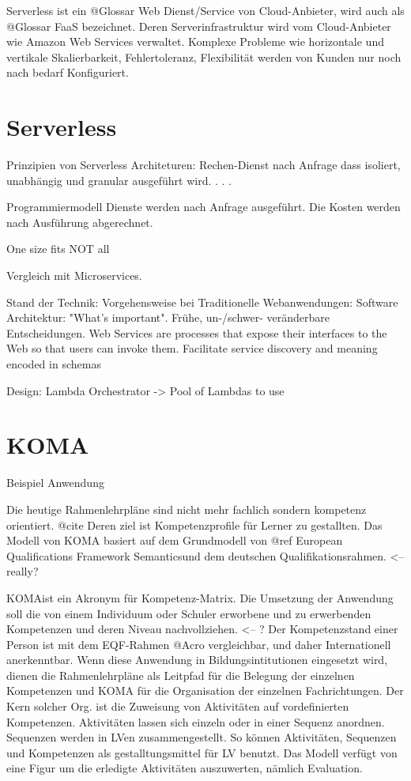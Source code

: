 \documentclass[
12pt,
english,
ngerman,
headsepline,
twoside,
openright,
numbers=noenddot,version=first
]{scrreprt}
\begin{document}
Serverless ist ein @Glossar Web Dienst/Service von Cloud-Anbieter, wird auch als @Glossar FaaS bezeichnet. Deren Serverinfrastruktur wird vom Cloud-Anbieter wie Amazon Web Services verwaltet. Komplexe Probleme wie horizontale und vertikale Skalierbarkeit, Fehlertoleranz, Flexibilität werden von Kunden nur noch nach bedarf Konfiguriert. 


\section{Serverless}
\label{sec:serverless}
Prinzipien von Serverless Architeturen: \cite{sbarski2017serverless}
Rechen-Dienst nach Anfrage dass isoliert, unabhängig und granular ausgeführt wird. 
. . .



Programmiermodell 
Dienste werden nach Anfrage ausgeführt. 
Die Kosten werden nach Ausführung abgerechnet. 

One size fits NOT all

Vergleich mit Microservices.


Stand der Technik: 
Vorgehensweise bei Traditionelle Webanwendungen:  
Software Architektur: "What's important". Frühe, un-/schwer- veränderbare Entscheidungen.
Web Services are processes that expose their interfaces to the Web so that users can invoke them. Facilitate service discovery and meaning encoded in schemas


Design: Lambda Orchestrator -> Pool of Lambdas to use

\section{KOMA}{Beispiel Anwendung}
\label{sec:KOMA}

Die heutige Rahmenlehrpläne sind nicht mehr fachlich sondern kompetenz orientiert. @cite Deren ziel ist Kompetenzprofile
für Lerner zu gestallten. Das Modell von KOMA basiert auf dem Grundmodell von
@ref \glqq European Qualifications Framework Semantics\grqq und dem deutschen Qualifikationsrahmen. <-- really?

\glqq KOMA\grqq ist ein Akronym für Kompetenz-Matrix. Die Umsetzung der Anwendung soll die von einem Individuum oder Schuler
erworbene und zu erwerbenden Kompetenzen und deren Niveau nachvollziehen. <-- ?
Der Kompetenzstand einer Person ist mit dem EQF-Rahmen @Acro vergleichbar, und daher Internationell anerkenntbar.
Wenn diese Anwendung in Bildungsintitutionen eingesetzt wird, dienen die Rahmenlehrpläne als Leitpfad für die Belegung der einzelnen Kompetenzen
und KOMA für die Organisation der einzelnen Fachrichtungen. Der Kern solcher Org. ist die Zuweisung von Aktivitäten auf vordefinierten Kompetenzen.
Aktivitäten lassen sich einzeln oder in einer Sequenz anordnen. Sequenzen werden in LVen zusammengestellt. So können Aktivitäten, Sequenzen und Kompetenzen
als gestalltungsmittel für LV benutzt. Das Modell verfügt von eine Figur um die erledigte Aktivitäten auszuwerten, nämlich Evaluation.
\end{document}
